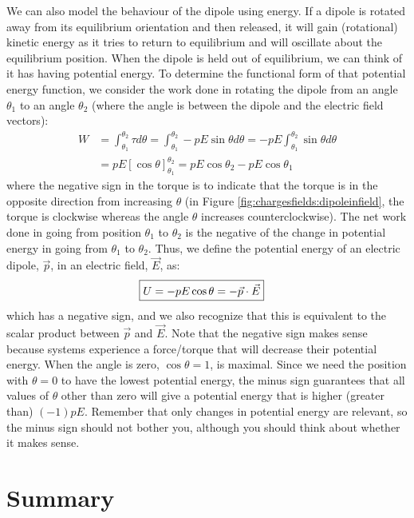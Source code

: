 We can also model the behaviour of the dipole using energy. If a dipole is rotated away from its equilibrium orientation and then released, it will gain (rotational) kinetic energy as it tries to return to equilibrium and will oscillate about the equilibrium position. When the dipole is held out of equilibrium, we can think of it has having potential energy. To determine the functional form of that potential energy function, we consider the work done in rotating the dipole from an angle $\theta_1$ to an angle $\theta_2$ (where the angle is between the dipole and the electric field vectors):
\begin{align*}
W&=\int_{\theta_1}^{\theta_2} \tau d\theta=\int_{\theta_1}^{\theta_2} -pE\sin\theta d\theta=-pE\int_{\theta_1}^{\theta_2} \sin\theta d\theta\\
&=pE[\cos\theta]_{\theta_1}^{\theta_2}=pE\cos\theta_2-pE\cos\theta_1
\end{align*}
where the negative sign in the torque is to indicate that the torque is in the opposite direction from increasing $\theta$ (in Figure \ref{fig:chargesfields:dipoleinfield}, the torque is clockwise whereas the angle $\theta$ increases counterclockwise). The net work done in going from position $\theta_1$ to $\theta_2$ is the negative of the change in potential energy in going from $\theta_1$ to $\theta_2$. Thus, we define the potential energy of an electric dipole, $\vec p$, in an electric field, $\vec E$, as:
\begin{align*}
\Aboxed{U=-pE\cos\theta=-\vec p\cdot \vec E}
\end{align*}
which has a negative sign, and we also recognize that this is equivalent to the scalar product between $\vec p$ and $\vec E$. Note that the negative sign makes sense because systems experience a force/torque that will decrease their potential energy. When the angle is zero, $\cos\theta=1$, is maximal. Since we need the position with $\theta=0$ to have the lowest potential energy, the minus sign guarantees that all values of $\theta$ other than zero will give a potential energy that is higher (greater than) $(-1) pE$. Remember that only changes in potential energy are relevant, so the minus sign should not bother you, although you should think about whether it makes sense.

\newpage
\section{Summary}

